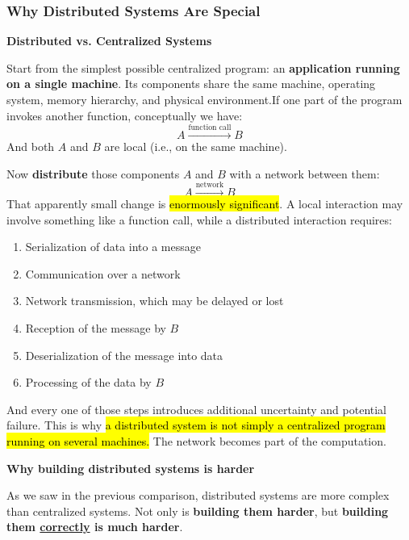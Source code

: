 \subsubsection{Why Distributed Systems Are Special}\label{subsubsec:introduction--why-distributed-systems--why-distributed-systems-are-special}

\begin{flushleft}
    \textcolor{Green3}{ \textbf{Distributed vs. Centralized Systems}}
\end{flushleft}
Start from the simplest possible centralized program: an \textbf{application running on a single machine}. Its components share the same machine, operating system, memory hierarchy, and physical environment.If one part of the program invokes another function, conceptually we have:
\begin{equation*}
    A \xrightarrow{\text{function call}} B
\end{equation*}
And both $A$ and $B$ are local (i.e., on the same machine).

\highspace
Now \textbf{distribute} those components $A$ and $B$ with a network between them:
\begin{equation*}
    A \xrightarrow{\text{network}} B
\end{equation*}
That apparently small change is \hl{enormously significant}. A local interaction may involve something like a function call, while a distributed interaction requires:
\begin{enumerate}
    \item Serialization of data into a message
    \item Communication over a network
    \item Network transmission, which may be delayed or lost
    \item Reception of the message by $B$
    \item Deserialization of the message into data
    \item Processing of the data by $B$
\end{enumerate}
And every one of those steps introduces additional uncertainty and potential failure. This is why \hl{a distributed system is not simply a centralized program running on several machines.} The network becomes part of the computation.

\highspace
\begin{flushleft}
    \textcolor{Red2}{ \textbf{Why building distributed systems is harder}}
\end{flushleft}
As we saw in the previous comparison, distributed systems are more complex than centralized systems. Not only is \textbf{building them harder}, but \textbf{building them \underline{correctly} is much harder}.

